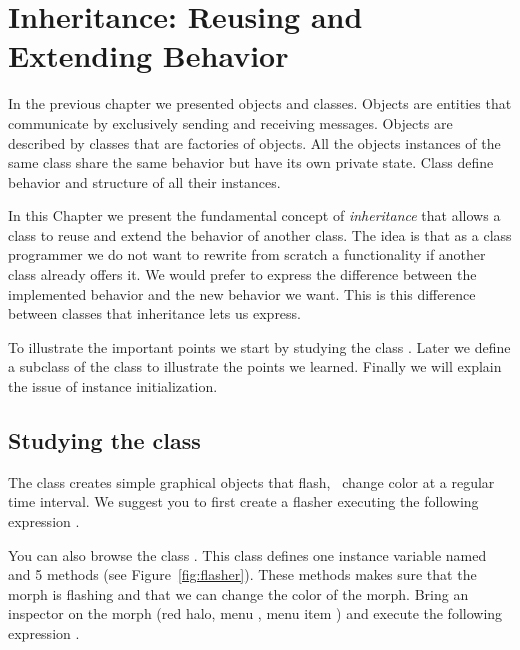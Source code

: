 \ifx\wholebook\relax\else



\fi

\chapter{Inheritance: Reusing and Extending Behavior}\label{cha:inheritance}

In the previous chapter we presented objects and classes. Objects are entities that communicate by exclusively sending and receiving messages. Objects are described by classes that are factories of objects. All the objects instances of the same class share the same behavior but have its own private state. Class define behavior and structure of all their instances. 

In this Chapter we present the fundamental concept of  \emph{inheritance} that allows a class to reuse and extend the behavior of another class. The idea is that as a class programmer we do not want to rewrite from scratch a functionality if another class already offers it. We would prefer to express the difference between the implemented behavior and the new behavior we want. This is this difference between classes that inheritance lets us express. 

To illustrate the important points we start by studying the class . Later we define a subclass of the class  to illustrate the points we learned. Finally we will explain the issue of instance initialization. 

\section{Studying the  class}
The class  creates simple graphical objects that flash, \ie\ change color at a regular time interval. We suggest you to first create a flasher executing the following expression .

You can also browse the class . This class defines one instance variable named  and 5 methods (see Figure~\ref{fig:flasher}). These methods makes sure that the morph is flashing and that we can change the color of the morph. Bring an inspector on the morph (red halo, menu , menu item ) and execute the following expression .

